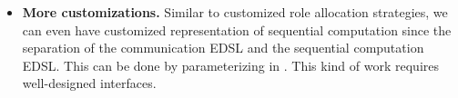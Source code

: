 \begin{itemize}
    \item \textbf{More customizations. } Similar to customized role allocation strategies, we can even have customized representation of sequential computation since the separation of the communication EDSL and the sequential computation EDSL. This can be done by parameterizing  in . This kind of work requires well-designed interfaces.
\end{itemize}